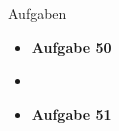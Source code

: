 \documentclass[14pt, aspectratio=169, handout]{beamer}
\begin{document}
\begin{frame}{Aufgaben}
    \begin{itemize}
        \item \textbf{Aufgabe 50}
        \item[] 
        \item \textbf{Aufgabe 51}
    \end{itemize}
\end{frame}



\end{document}
